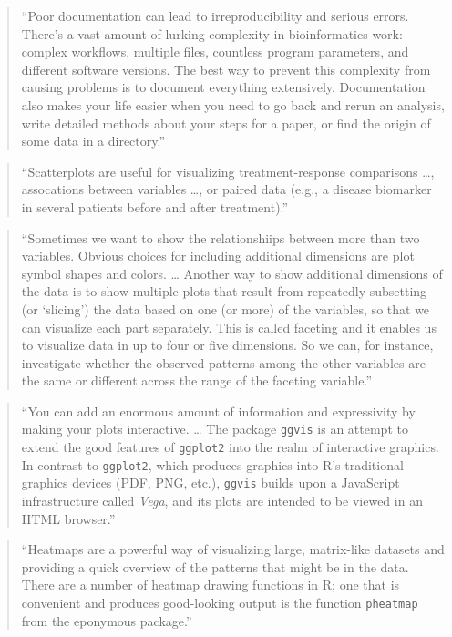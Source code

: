 \documentclass[]{tufte-book}
\begin{document}
\begin{quote}
``Poor documentation can lead to irreproducibility and serious errors. There's
a vast amount of lurking complexity in bioinformatics work: complex workflows,
multiple files, countless program parameters, and different software versions.
The best way to prevent this complexity from causing problems is to document
everything extensively. Documentation also makes your life easier when you need to
go back and rerun an analysis, write detailed methods about your steps for a
paper, or find the origin of some data in a directory.'' \citep{buffalo2015bioinformatics}
\end{quote}

\begin{quote}
``Scatterplots are useful for visualizing treatment-response comparisons \ldots,
assocations between variables \ldots, or paired data (e.g., a disease biomarker in
several patients before and after treatment).'' \citep{holmes2018modern}
\end{quote}

\begin{quote}
``Sometimes we want to show the relationshiips between more than two variables.
Obvious choices for including additional dimensions are plot symbol shapes and
colors. \ldots{} Another way to show additional dimensions of the data is to show
multiple plots that result from repeatedly subsetting (or `slicing') the data
based on one (or more) of the variables, so that we can visualize each part
separately. This is called faceting and it enables us to visualize data in up to
four or five dimensions. So we can, for instance, investigate whether the
observed patterns among the other variables are the same or different across the
range of the faceting variable.'' \citep{holmes2018modern}
\end{quote}

\begin{quote}
``You can add an enormous amount of information and expressivity by making your
plots interactive. \ldots{} The package \texttt{ggvis} is an attempt to extend the good
features of \texttt{ggplot2} into the realm of interactive graphics. In contrast to
\texttt{ggplot2}, which produces graphics into R's traditional graphics devices (PDF,
PNG, etc.), \texttt{ggvis} builds upon a JavaScript infrastructure called \emph{Vega}, and
its plots are intended to be viewed in an HTML browser.'' \citep{holmes2018modern}
\end{quote}

\begin{quote}
``Heatmaps are a powerful way of visualizing large, matrix-like datasets and
providing a quick overview of the patterns that might be in the data. There
are a number of heatmap drawing functions in R; one that is convenient and
produces good-looking output is the function \texttt{pheatmap} from the eponymous
package.'' \citep{holmes2018modern}
\end{quote}
\end{document}
